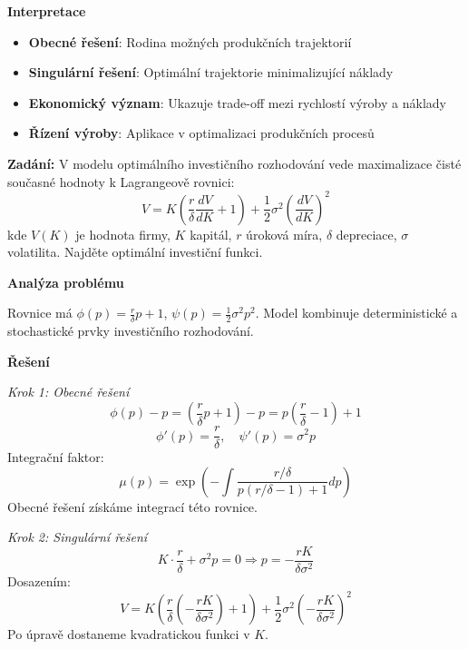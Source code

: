 \begin{example}
\vspace{1.5\baselineskip}

\noindent\textbf{Interpretace}
\begin{itemize}
\item \textbf{Obecné řešení}: Rodina možných produkčních trajektorií
\item \textbf{Singulární řešení}: Optimální trajektorie minimalizující náklady
\item \textbf{Ekonomický význam}: Ukazuje trade-off mezi rychlostí výroby a náklady
\item \textbf{Řízení výroby}: Aplikace v optimalizaci produkčních procesů
\end{itemize}

\end{example}

\begin{example}
\label{ex:teorie-investic}

\noindent\textbf{Zadání:} V modelu optimálního investičního rozhodování vede maximalizace čisté současné hodnoty k Lagrangeově rovnici:
\[
V = K\left(\frac{r}{\delta} \frac{dV}{dK} + 1\right) + \frac{1}{2}\sigma^2 \left(\frac{dV}{dK}\right)^2
\]
kde $V(K)$ je hodnota firmy, $K$ kapitál, $r$ úroková míra, $\delta$ depreciace, $\sigma$ volatilita. Najděte optimální investiční funkci.

\vspace{1.5\baselineskip}

\noindent\textbf{Analýza problému}

Rovnice má $\phi(p) = \frac{r}{\delta}p + 1$, $\psi(p) = \frac{1}{2}\sigma^2 p^2$. Model kombinuje deterministické a stochastické prvky investičního rozhodování.

\vspace{1.5\baselineskip}

\noindent\textbf{Řešení}

\noindent\textit{Krok 1: Obecné řešení}
\[
\phi(p) - p = \left(\frac{r}{\delta}p + 1\right) - p = p\left(\frac{r}{\delta} - 1\right) + 1
\]
\[
\phi'(p) = \frac{r}{\delta}, \quad \psi'(p) = \sigma^2 p
\]
Integrační faktor:
\[
\mu(p) = \exp\left(-\int \frac{r/\delta}{p(r/\delta - 1) + 1} dp\right)
\]
Obecné řešení získáme integrací této rovnice.

\vspace{1\baselineskip}

\noindent\textit{Krok 2: Singulární řešení}
\[
K\cdot\frac{r}{\delta} + \sigma^2 p = 0 \Rightarrow p = -\frac{rK}{\delta\sigma^2}
\]
Dosazením:
\[
V = K\left(\frac{r}{\delta}\left(-\frac{rK}{\delta\sigma^2}\right) + 1\right) + \frac{1}{2}\sigma^2 \left(-\frac{rK}{\delta\sigma^2}\right)^2
\]
Po úpravě dostaneme kvadratickou funkci v $K$.


\end{example}
